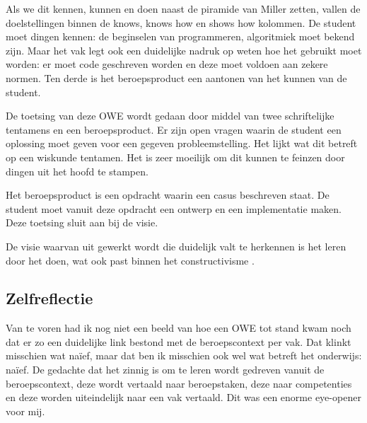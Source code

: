 Als we dit kennen, kunnen en doen naast de piramide van Miller zetten, vallen de doelstellingen binnen de knows, knows how en shows how kolommen. De student moet dingen kennen: de beginselen van programmeren, algoritmiek moet bekend zijn. Maar het vak legt ook een duidelijke nadruk op weten hoe het gebruikt moet worden: er moet code geschreven worden en deze moet voldoen aan zekere normen. Ten derde is het beroepsproduct een aantonen van het kunnen van de student.

De toetsing van deze OWE wordt gedaan door middel van twee schriftelijke tentamens en een beroepsproduct. Er zijn open vragen waarin de student een oplossing moet geven voor een gegeven probleemstelling. Het lijkt wat dit betreft op een wiskunde tentamen. Het is zeer moeilijk om dit kunnen te feinzen door dingen uit het hoofd te stampen.

Het beroepsproduct is een opdracht waarin een casus beschreven staat. De student moet vanuit deze opdracht een ontwerp en een implementatie maken. Deze toetsing sluit aan bij de visie.

De visie waarvan uit gewerkt wordt die duidelijk valt te herkennen is het leren door het doen, wat ook past binnen het constructivisme \cite{keursten2006ontwikkeling}.
 
\subsection{Zelfreflectie}
Van te voren had ik nog niet een beeld van hoe een OWE tot stand kwam noch dat er zo een duidelijke link bestond met de beroepscontext per vak. Dat klinkt misschien wat naïef, maar dat ben ik misschien ook wel wat betreft het onderwijs: naïef. De gedachte dat het zinnig is om te leren wordt gedreven vanuit de beroepscontext, deze wordt vertaald naar beroepstaken, deze naar competenties en deze worden uiteindelijk naar een vak vertaald. Dit was een enorme eye-opener voor mij.

